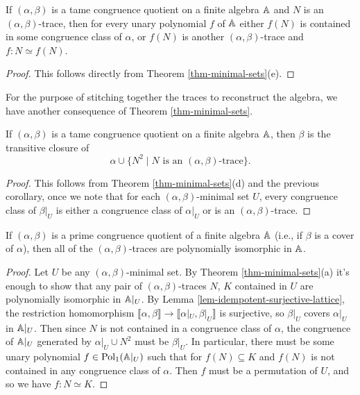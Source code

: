 \begin{appendices}
\begin{cor}\label{cor-trace-iso} If $(\alpha,\beta)$ is a tame congruence quotient on a finite algebra $\mathbb{A}$ and $N$ is an $(\alpha,\beta)$-trace, then for every unary polynomial $f$ of $\mathbb{A}$ either $f(N)$ is contained in some congruence class of $\alpha$, or $f(N)$ is another $(\alpha,\beta)$-trace and $f : N \simeq f(N)$.
\end{cor}
\begin{proof} This follows directly from Theorem \ref{thm-minimal-sets}(e).
\end{proof}

For the purpose of stitching together the traces to reconstruct the algebra, we have another consequence of Theorem \ref{thm-minimal-sets}.

\begin{cor}\label{cor-trace-closure} If $(\alpha,\beta)$ is a tame congruence quotient on a finite algebra $\mathbb{A}$, then $\beta$ is the transitive closure of
\[
\alpha \cup \{N^2 \mid N \text{ is an }(\alpha,\beta)\text{-trace}\}.
\]
\end{cor}
\begin{proof} This follows from Theorem \ref{thm-minimal-sets}(d) and the previous corollary, once we note that for each $(\alpha,\beta)$-minimal set $U$, every congruence class of $\beta|_U$ is either a congruence class of $\alpha|_U$ or is an $(\alpha,\beta)$-trace.
\end{proof}

\begin{prop} If $(\alpha,\beta)$ is a prime congruence quotient of a finite algebra $\mathbb{A}$ (i.e., if $\beta$ is a cover of $\alpha$), then all of the $(\alpha,\beta)$-traces are polynomially isomorphic in $\mathbb{A}$.
\end{prop}
\begin{proof} Let $U$ be any $(\alpha,\beta)$-minimal set. By Theorem \ref{thm-minimal-sets}(a) it's enough to show that any pair of $(\alpha,\beta)$-traces $N$, $K$ contained in $U$ are polynomially isomorphic in $\mathbb{A}|_U$. By Lemma \ref{lem-idempotent-surjective-lattice}, the restriction homomorphism $\llbracket \alpha, \beta \rrbracket \rightarrow \llbracket \alpha|_U, \beta|_U \rrbracket$ is surjective, so $\beta|_U$ covers $\alpha|_U$ in $\mathbb{A}|_U$. Then since $N$ is not contained in a congruence class of $\alpha$, the congruence of $\mathbb{A}|_U$ generated by $\alpha|_U \cup N^2$ must be $\beta|_U$. In particular, there must be some unary polynomial $f \in \operatorname{Pol}_1(\mathbb{A}|_U)$ such that for $f(N) \subseteq K$ and $f(N)$ is not contained in any congruence class of $\alpha$. Then $f$ must be a permutation of $U$, and so we have $f : N \simeq K$.
\end{proof}


\end{appendices}
